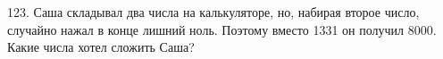 123. Саша складывал два числа на калькуляторе, но, набирая второе число, случайно нажал в конце лишний ноль. Поэтому вместо 1331 он получил 8000. Какие числа хотел сложить Саша?\\
